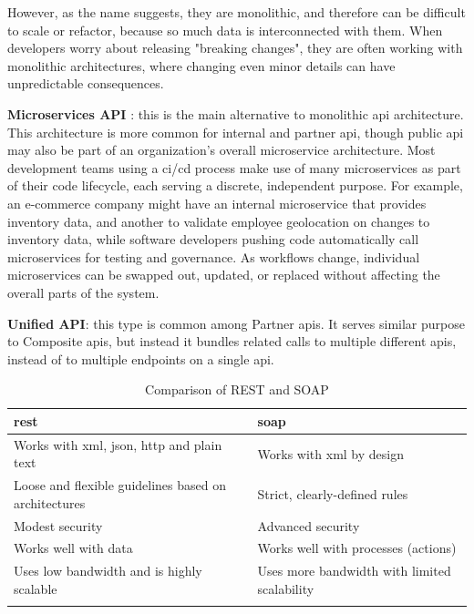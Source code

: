 However, as the name suggests, they are monolithic, and therefore can be difficult to scale or refactor, because so much
data is interconnected with them. When developers worry about releasing "breaking changes", they are often working with
monolithic architectures, where changing even minor details can have unpredictable consequences.

\textbf{Microservices API} \label{microservicesapi}: this is the main alternative to monolithic \acrshort{api}
architecture. This architecture is more common for internal and partner \acrshort{api}, though public \acrshort{api}
may also be part of an organization's overall microservice architecture. Most development teams using a
\acrshort{ci}/\acrshort{cd} process make use of many microservices as part of their code lifecycle, each serving a
discrete, independent purpose. For example, an e-commerce company might have an internal microservice that
provides inventory data, and another to validate employee geolocation on changes to inventory data, while
software developers pushing code automatically call microservices for testing and governance. As workflows
change, individual microservices can be swapped out, updated, or replaced without affecting the overall parts
of the system.

\textbf{Unified API}: this type is common among Partner \acrshort{api}s. It serves similar purpose to Composite
\acrshort{api}s, but instead it bundles related calls to multiple different \acrshort{api}s, instead of to multiple
endpoints on a single \acrshort{api}.

\begin{longtable}{|p{8cm}||p{8cm}|}
    \hline
    \rowcolor{blue!20}
    \acrshort{rest}                                                            & \acrshort{soap}                              \\
    \endfirsthead
    \hline
    Works with \acrshort{xml}, \acrshort{json}, \acrshort{http} and plain text & Works with \acrshort{xml} by design          \\
    \hline
    Loose and flexible guidelines based on architectures                       & Strict, clearly-defined rules                \\
    \hline
    Modest security                                                            & Advanced security                            \\
    \hline
    Works well with data                                                       & Works well with processes (actions)          \\
    \hline
    Uses low bandwidth and is highly scalable                                  & Uses more bandwidth with limited scalability \\
    \hline
    \caption{Comparison of REST and SOAP}
    \label{tab:restvsoap}
\end{longtable}

